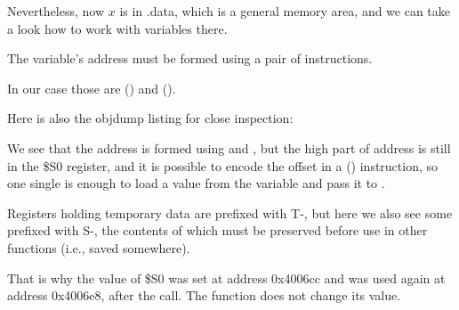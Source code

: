Nevertheless, now $x$ is in .data, which is a general memory area, and we can take a look
how to work with variables there.


The variable's address must be formed using a pair of instructions.

In our case those are  () and  ().

Here is also the objdump listing for close inspection:




We see that the address is formed using  and , but the high part of address is still in
the \$S0 register, and it is possible to encode the offset in a  () instruction, so one single  is enough 
to load a value from the variable and pass it to \printf.

Registers holding temporary data are prefixed with T-, but here we also see some prefixed with S-, 
the contents of which must be preserved before use in other functions (i.e., saved somewhere).

That is why the value of \$S0 was set at address 0x4006cc and was used again
at address 0x4006e8, after the \scanf call. 
The \scanf function does not change its value.

